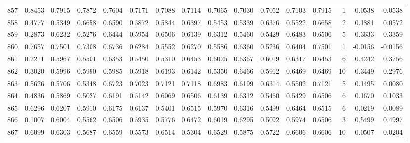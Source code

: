 \begin{tabular}{lrrrrrrrrrrrrrrr}
857 &      0.8453 &  0.7915 &  0.7872 &  0.7604 &  0.7171 &  0.7088 &  0.7114 &  0.7065 &  0.7030 &  0.7052 &   0.7103 &     0.7915 &      1 &                   -0.0538 &                    -0.0538 \\
858 &      0.4777 &  0.5349 &  0.6658 &  0.6590 &  0.5872 &  0.5844 &  0.6397 &  0.5453 &  0.5339 &  0.6376 &   0.5522 &     0.6658 &      2 &                    0.1881 &                     0.0572 \\
859 &      0.2873 &  0.6232 &  0.5276 &  0.6444 &  0.5954 &  0.6506 &  0.6139 &  0.6312 &  0.5460 &  0.5429 &   0.6483 &     0.6506 &      5 &                    0.3633 &                     0.3359 \\
860 &      0.7657 &  0.7501 &  0.7308 &  0.6736 &  0.6284 &  0.5552 &  0.6270 &  0.5586 &  0.6360 &  0.5236 &   0.6404 &     0.7501 &      1 &                   -0.0156 &                    -0.0156 \\
861 &      0.2211 &  0.5967 &  0.5501 &  0.6353 &  0.5450 &  0.5310 &  0.6453 &  0.6025 &  0.6367 &  0.6019 &   0.6317 &     0.6453 &      6 &                    0.4242 &                     0.3756 \\
862 &      0.3020 &  0.5996 &  0.5990 &  0.5985 &  0.5918 &  0.6193 &  0.6142 &  0.5350 &  0.6466 &  0.5912 &   0.6469 &     0.6469 &     10 &                    0.3449 &                     0.2976 \\
863 &      0.5626 &  0.5706 &  0.5348 &  0.6723 &  0.7023 &  0.7121 &  0.7118 &  0.6983 &  0.6199 &  0.6314 &   0.5502 &     0.7121 &      5 &                    0.1495 &                     0.0080 \\
864 &      0.4836 &  0.5869 &  0.5027 &  0.6191 &  0.5142 &  0.6069 &  0.6506 &  0.6139 &  0.6312 &  0.5460 &   0.5429 &     0.6506 &      6 &                    0.1670 &                     0.1033 \\
865 &      0.6296 &  0.6207 &  0.5910 &  0.6175 &  0.6137 &  0.5401 &  0.6515 &  0.5970 &  0.6316 &  0.5499 &   0.6464 &     0.6515 &      6 &                    0.0219 &                    -0.0089 \\
866 &      0.1007 &  0.6004 &  0.5562 &  0.6506 &  0.5935 &  0.5776 &  0.6472 &  0.6019 &  0.6295 &  0.5092 &   0.5974 &     0.6506 &      3 &                    0.5499 &                     0.4997 \\
867 &      0.6099 &  0.6303 &  0.5687 &  0.6559 &  0.5573 &  0.6514 &  0.5304 &  0.6529 &  0.5875 &  0.5722 &   0.6606 &     0.6606 &     10 &                    0.0507 &                     0.0204 \\

\end{tabular}
